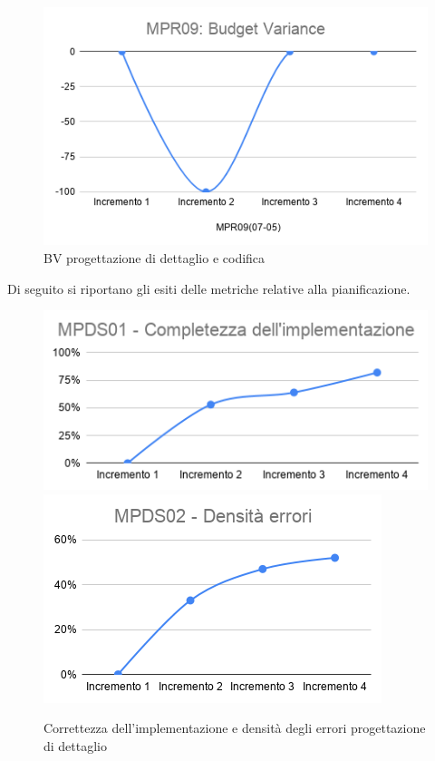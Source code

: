 \begin{figure}[h!]
	\centering
	\includegraphics[scale=0.6]{Immagini/BV_PDettaglio.png}
	\caption{BV progettazione di dettaglio e codifica}
	\label{fig:BV_PDettaglio}
\end{figure}
Di seguito si riportano gli esiti delle metriche relative alla pianificazione.
\begin{figure}[h!]
	\includegraphics[scale=0.6]{Immagini/MPDS01_CompletezzaImpl.png}\quad
	\includegraphics[scale=0.6]{Immagini/MPDS02_DErrori.png}
	\caption{Correttezza dell'implementazione e densità degli errori progettazione di dettaglio}
	\label{fig:DensitàErr}
\end{figure}
